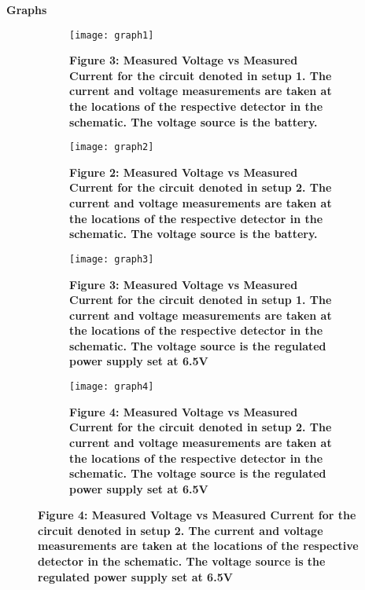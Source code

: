 \newpage
{\large\textbf{Graphs}}
\begin{figure}[H]
    \centering
	\begin{subfigure}{0.45\textwidth}
		\texttt{[image: graph1]}
		\caption{\textbf{Figure 3: Measured Voltage vs Measured Current for the circuit denoted in setup 1. The current and voltage measurements are taken at the locations of the respective detector in the schematic. The voltage source is the battery.}}
	\end{subfigure}
    \hspace{0.08\textwidth}
	\begin{subfigure}{0.45\textwidth}
		\texttt{[image: graph2]}
		\caption{\textbf{Figure 2: Measured Voltage vs Measured Current for the circuit denoted in setup 2. The current and voltage measurements are taken at the locations of the respective detector in the schematic. The voltage source is the battery.}}
	\end{subfigure}
    \begin{subfigure}{0.45\textwidth}
		\texttt{[image: graph3]}
		\caption{\textbf{Figure 3: Measured Voltage vs Measured Current for the circuit denoted in setup 1. The current and voltage measurements are taken at the locations of the respective detector in the schematic. The voltage source is the regulated power supply set at 6.5V}}
	\end{subfigure}
    \hspace{0.08\textwidth}
	\begin{subfigure}{0.45\textwidth}
		\texttt{[image: graph4]}
		\caption{\textbf{Figure 4: Measured Voltage vs Measured Current for the circuit denoted in setup 2. The current and voltage measurements are taken at the locations of the respective detector in the schematic. The voltage source is the regulated power supply set at 6.5V}}
	\end{subfigure}

\end{figure}

